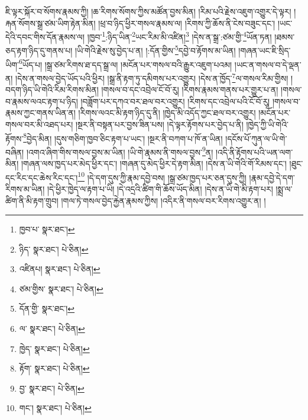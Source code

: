 ཇི་ལྟར་སྐོར་བ་སོགས་རྣམས་ཀྱི། །ཆ་རིགས་སོགས་ཀྱིས་མཚོན་བྱས་མིན། །རིམ་པའི་རྗེས་འཇུག་འགྱུར་དེ་ལྟར། །རྐན་སོགས་སྒྲ་ཙམ་ཡིག་རྟེན་མིན། །ཕྲ་བ་ཉིད་ཕྱིར་གསལ་རྣམས་ལ། །རིགས་ཀྱི་ཆོས་ནི་ངེས་བཟུང་དང་། །ཡང་དེའི་དབང་གིས་དོན་རྣམས་ལ། །ཁྱབ་\footnote{ཁྱབ་པ་  སྣར་ཐང་། }:ཉིད་ཡིན་\footnote{ཉིད་  སྣར་ཐང་།  པེ་ཅིན། }ཡང་རིམ་མི་འཛིན།\footnote{འཛིནཔ།  སྣར་ཐང་།  པེ་ཅིན། } །དེས་ན་སྒྲ་:ཙམ་གྱི་\footnote{ཙམ་གྱིས་  སྣར་ཐང་།  པེ་ཅིན། }ཡོན་ཏན། །ཐམས་ཅད་རྟག་ཉིད་དུ་གནས་པ། །ཡི་གེའི་རྗེས་སུ་བྱེད་པ་ན། །:དོན་གྱིས་\footnote{དོན་གྱི་  སྣར་ཐང་། }དབྱེ་བ་རྟོགས་མ་ཡིན། །གཞན་ཡང་ཇི་སྲིད་ཡིག་\footnote{ལ་  སྣར་ཐང་།  པེ་ཅིན། }ཡོད་པ། །སྒྲ་ཙམ་རིགས་ཐ་དད་སྒྲ་ལ། །མངོན་པར་གསལ་བའི་རྒྱུར་འཇུག་པའམ། །ཡང་ན་གསལ་བ་དེ་ལྡན་ན། །དེས་ན་གསལ་བྱེད་ཡོད་པའི་ཕྱིར། །སྒྲ་ནི་རྟག་ཏུ་དམིགས་པར་འགྱུར། །དེས་ན་ཁྱོད་\footnote{ཁྱེད་  སྣར་ཐང་།  པེ་ཅིན། }ལ་གསལ་རིམ་གྱིས། །བདག་ཉིད་ཡི་གེའི་རིམ་རིགས་མིན། །གསལ་བ་དང་འབྲེལ་ངོ་བོ་རུ། །རིགས་རྣམས་གནས་པར་གྱུར་པ་ན། །གསལ་བ་རྣམས་ལའང་རྟག་པ་ཉིད། །བཟློག་པར་དཀའ་བར་ཐལ་བར་འགྱུར། །རིགས་དང་འབྲེལ་པའི་ངོ་བོ་རུ། །གསལ་བ་རྣམས་ཀྱང་གནས་ཡིན་ན། །རིགས་ལའང་མི་རྟག་ཉིད་དུ་ནི། །ཁྱེད་མི་འདོད་ཀྱང་ཐལ་བར་འགྱུར། །མངོན་པར་གསལ་བར་མི་འཐད་པར། །སྔར་ནི་བསྟན་པར་བྱས་ཟིན་པས། །དེ་ལྟར་རྟོགས་པར་བྱེད་པ་ནི། །ཁྱེད་ཀྱི་ཡི་གེའི་རྟོགས་\footnote{རྟོག་  སྣར་ཐང་།  པེ་ཅིན། }བྱེད་མིན། །དུས་གཅིག་ཁྱབ་ཅིང་རྟག་པ་ཡང་། །སྔར་ནི་བཀག་པ་ཁོ་ན་ཡིན། །དངོས་པོ་ཀུན་ལ་ཡི་གེ་བཞིན། །འགའ་ཞིག་གིས་གསལ་བྱས་མ་ཡིན། །ཡི་གེ་རྣམས་ནི་གསལ་བྱས་\footnote{བྱ་  སྣར་ཐང་།  པེ་ཅིན། }ན། །འདི་ནི་རྟོགས་པའི་ཡན་ལག་མིན། །གཞན་ལས་ཁྱད་པར་མེད་ཕྱིར་དང་། །གཞན་དུ་མེད་ཕྱིར་དེ་རྟག་མིན། །དེས་ན་ཡི་གེའི་གོ་རིམས་དང་། །ཐུང་དང་རིང་དང་ཆེས་རིང་དང་།\footnote{གང་།  སྣར་ཐང་།  པེ་ཅིན། } །དེ་དག་དུས་ཀྱི་རྣམ་དབྱེ་བས། །སྒྲ་ཙམ་ཁྱད་པར་ཅན་དུས་ཀྱི། །རྣམ་དབྱེ་དེ་དག་རིགས་མ་ཡིན། །དེ་ཕྱིར་ཁྱེད་ལ་རྟག་པ་ཡི། །དེ་འདྲའི་ཚིག་གི་ཆོས་ཡོད་མིན། །དེས་ན་ཡི་གེ་མི་རྟག་པར། །སྨྲ་ལ་ཚིག་ནི་མི་རྟག་གྲུབ། །གལ་ཏེ་གསལ་བྱེད་རྐྱེན་རྣམས་ཀྱིས། །འདིར་ནི་གསལ་བར་རིགས་འགྱུར་ན། །
